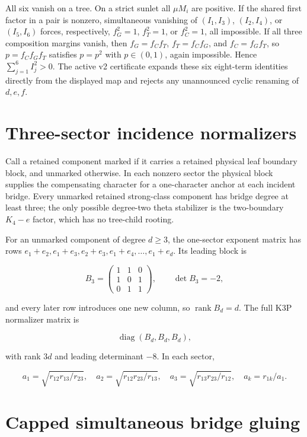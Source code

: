\documentclass[10pt]{article}
\newcommand{\rank}{\operatorname{rank}}
\begin{document}
All six vanish on a tree.  On a strict sunlet all \(\mu M_i\) are positive.
If the shared first factor in a pair is nonzero, simultaneous vanishing of
\((I_1,I_3)\), \((I_2,I_4)\), or \((I_5,I_6)\) forces, respectively,
\(f_G^2=1\), \(f_T^2=1\), or \(f_C^2=1\), all impossible.  If all three
composition margins vanish, then
\(f_G=f_Cf_T\), \(f_T=f_Cf_G\), and \(f_C=f_Gf_T\), so
\(p=f_Cf_Gf_T\) satisfies \(p=p^2\) with \(p\in(0,1)\), again impossible.
Hence \(\sum_{j=1}^6 I_j^2>0\).  The active v2 certificate expands these six
eight-term identities directly from the displayed map and rejects any
unannounced cyclic renaming of \(d,e,f\).

\section{Three-sector incidence normalizers}

Call a retained component marked if it carries a retained physical leaf
boundary block, and unmarked otherwise.  In each nonzero sector the physical
block supplies the compensating character for a one-character anchor at each
incident bridge.  Every unmarked retained strong-class component has bridge
degree at least three; the only possible degree-two theta stabilizer is the
two-boundary \(K_4-e\) factor, which has no tree-child rooting.

For an unmarked component of degree \(d\ge3\), the one-sector exponent matrix
has rows \(e_1+e_2,e_1+e_3,e_2+e_3,e_1+e_4,\ldots,e_1+e_d\).  Its leading
block is

\[
B_3=\begin{pmatrix}1&1&0\\1&0&1\\0&1&1\end{pmatrix},
\qquad\det B_3=-2,
\]

and every later row introduces one new column, so \(\rank B_d=d\).  The full
K3P normalizer matrix is

\[
\operatorname{diag}(B_d,B_d,B_d),
\]

with rank \(3d\) and leading determinant \(-8\).  In each sector,

\[
a_1=\sqrt{r_{12}r_{13}/r_{23}},\quad
a_2=\sqrt{r_{12}r_{23}/r_{13}},\quad
a_3=\sqrt{r_{13}r_{23}/r_{12}},\quad
a_k=r_{1k}/a_1.
\]

\section{Capped simultaneous bridge gluing}
\end{document}
